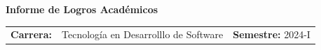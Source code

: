 \def\docente{Docente Demo Principal}
\def\escuela{Tecnología en Desarrolllo de Software}
\def\semestre{2024-I}
\def\escenario{Laboratorio}



\def\titulo{\textbf{Informe de Logros Académicos}}

\begin{center}
\Large\titulo\\     
\end{center}

\large
\begin{tabularx}{\textwidth}{ p{20mm} p{8.7cm} p{4cm}}

\textbf{Carrera:} & \escuela & \raggedleft \textbf{Semestre:}  \semestre \\
\end{tabularx}\vspace{10mm}
\renewcommand{\arraystretch}{1.5}
\noindent
